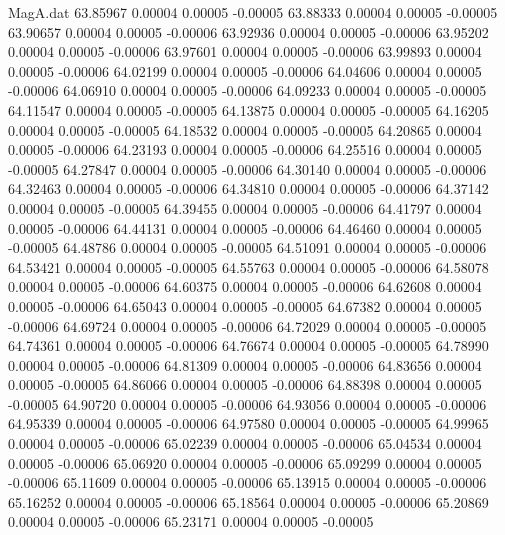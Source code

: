 \begin{filecontents}{MagA.dat}
  63.85967    0.00004    0.00005   -0.00005
  63.88333    0.00004    0.00005   -0.00005
  63.90657    0.00004    0.00005   -0.00006
  63.92936    0.00004    0.00005   -0.00006
  63.95202    0.00004    0.00005   -0.00006
  63.97601    0.00004    0.00005   -0.00006
  63.99893    0.00004    0.00005   -0.00006
  64.02199    0.00004    0.00005   -0.00006
  64.04606    0.00004    0.00005   -0.00006
  64.06910    0.00004    0.00005   -0.00006
  64.09233    0.00004    0.00005   -0.00005
  64.11547    0.00004    0.00005   -0.00005
  64.13875    0.00004    0.00005   -0.00005
  64.16205    0.00004    0.00005   -0.00005
  64.18532    0.00004    0.00005   -0.00005
  64.20865    0.00004    0.00005   -0.00006
  64.23193    0.00004    0.00005   -0.00006
  64.25516    0.00004    0.00005   -0.00005
  64.27847    0.00004    0.00005   -0.00006
  64.30140    0.00004    0.00005   -0.00006
  64.32463    0.00004    0.00005   -0.00006
  64.34810    0.00004    0.00005   -0.00006
  64.37142    0.00004    0.00005   -0.00005
  64.39455    0.00004    0.00005   -0.00006
  64.41797    0.00004    0.00005   -0.00006
  64.44131    0.00004    0.00005   -0.00006
  64.46460    0.00004    0.00005   -0.00005
  64.48786    0.00004    0.00005   -0.00005
  64.51091    0.00004    0.00005   -0.00006
  64.53421    0.00004    0.00005   -0.00005
  64.55763    0.00004    0.00005   -0.00006
  64.58078    0.00004    0.00005   -0.00006
  64.60375    0.00004    0.00005   -0.00006
  64.62608    0.00004    0.00005   -0.00006
  64.65043    0.00004    0.00005   -0.00005
  64.67382    0.00004    0.00005   -0.00006
  64.69724    0.00004    0.00005   -0.00006
  64.72029    0.00004    0.00005   -0.00005
  64.74361    0.00004    0.00005   -0.00006
  64.76674    0.00004    0.00005   -0.00005
  64.78990    0.00004    0.00005   -0.00006
  64.81309    0.00004    0.00005   -0.00006
  64.83656    0.00004    0.00005   -0.00005
  64.86066    0.00004    0.00005   -0.00006
  64.88398    0.00004    0.00005   -0.00005
  64.90720    0.00004    0.00005   -0.00006
  64.93056    0.00004    0.00005   -0.00006
  64.95339    0.00004    0.00005   -0.00006
  64.97580    0.00004    0.00005   -0.00005
  64.99965    0.00004    0.00005   -0.00006
  65.02239    0.00004    0.00005   -0.00006
  65.04534    0.00004    0.00005   -0.00006
  65.06920    0.00004    0.00005   -0.00006
  65.09299    0.00004    0.00005   -0.00006
  65.11609    0.00004    0.00005   -0.00006
  65.13915    0.00004    0.00005   -0.00006
  65.16252    0.00004    0.00005   -0.00006
  65.18564    0.00004    0.00005   -0.00006
  65.20869    0.00004    0.00005   -0.00006
  65.23171    0.00004    0.00005   -0.00005

\end{filecontents}
